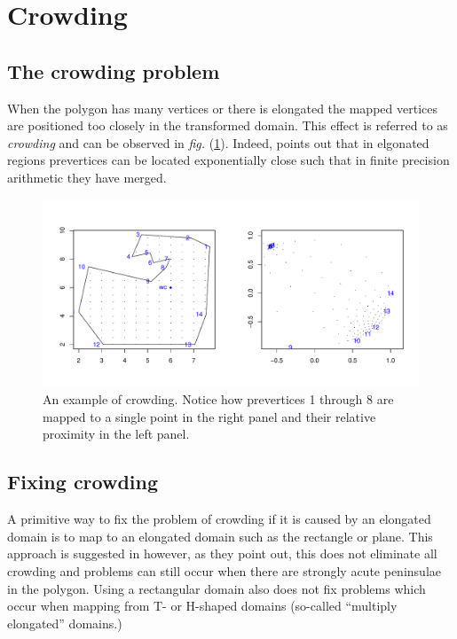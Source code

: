 \documentclass[a4paper,10pt]{amsart}
\newcommand{\fig}[1]{\emph{fig.} (\ref{#1})}
\begin{document}
\section{Crowding}

\subsection{The crowding problem}
When the polygon has many vertices or there is elongated the mapped vertices are positioned too closely in the transformed domain. This effect is referred to as \emph{crowding} and can be observed in \fig{crowdeddisk}. Indeed, \cite{howell90} points out that in elgonated regions prevertices can be located exponentially close such that in finite precision arithmetic they have merged.

\begin{figure} [tbp]
\centering
\includegraphics[scale=0.5]{figs/crowdeddisk.pdf}
\caption{An example of crowding. Notice how prevertices 1 through 8 are mapped to a single point in the right panel and their relative proximity in the left panel.}
\label{crowdeddisk}
\end{figure}

\subsection{Fixing crowding}

A primitive way to fix the problem of crowding if it is caused by an elongated domain is to map to an elongated domain such as the rectangle or plane. This approach is suggested in \cite{howell90} however, as they point out, this does not eliminate all crowding and problems can still occur when there are strongly acute peninsulae in the polygon. Using a rectangular domain also does not fix problems which occur when mapping from T- or H-shaped domains (so-called ``multiply elongated'' domains.)
\end{document}
